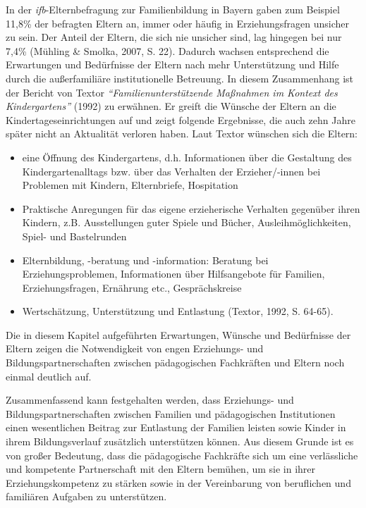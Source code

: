 \documentclass[12pt,a4paper]{article}
\begin{document}
	In der \textit{ifb}-Elternbefragung zur Familienbildung in Bayern gaben zum Beispiel 11,8\% der befragten Eltern an, immer oder häufig in Erziehungsfragen unsicher zu sein. Der Anteil der Eltern, die sich nie unsicher sind, lag hingegen bei nur 7,4\% (Mühling \& Smolka, 2007, S. 22). Dadurch wachsen entsprechend die Erwartungen und Bedürfnisse der Eltern nach mehr Unterstützung und Hilfe durch die außerfamiliäre institutionelle Betreuung. In diesem Zusammenhang ist der  Bericht von Textor \textit{"`Familienunterstützende Maßnahmen im Kontext des Kindergartens"'} (1992) zu erwähnen. Er greift die Wünsche der Eltern an die Kindertageseinrichtungen  auf und zeigt folgende Ergebnisse, die auch zehn Jahre später nicht an Aktualität verloren haben. Laut Textor wünschen sich die Eltern:
	\begin{itemize}
\item eine Öffnung des Kindergartens, d.h. Informationen über die Gestaltung des Kindergartenalltags bzw. über das Verhalten der Erzieher/-innen bei Problemen mit Kindern, Elternbriefe, Hospitation
 \item Praktische Anregungen für das eigene erzieherische Verhalten gegenüber ihren Kindern, z.B. Ausstellungen guter Spiele und Bücher, Aus\-leih\-mög\-lich\-kei\-ten, Spiel- und Bastelrunden
 \item Elternbildung, -beratung und -information: Beratung bei Erziehungsproblemen, Informationen  über Hilfsangebote für Familien, Erziehungsfragen, Ernährung  etc., Gesprächskreise
 \item Wertschätzung, Unterstützung und Entlastung (Textor, 1992, S. 64-65).
 \end{itemize}
 
Die in diesem Kapitel aufgeführten Erwartungen, Wünsche und Bedürfnisse der Eltern zeigen die Notwendigkeit von engen Erziehungs- und Bildungspartnerschaften zwischen pädagogischen Fachkräften und Eltern noch einmal deutlich auf.

	Zusammenfassend kann festgehalten werden, dass Erziehungs- und Bildungspartnerschaften zwischen Familien und pädagogischen Institutionen einen wesentlichen Beitrag zur Entlastung der Familien leisten sowie Kinder in ihrem Bildungsverlauf zusätzlich unterstützen können. Aus diesem Grunde ist es von großer Bedeutung, dass die pädagogische Fachkräfte sich um eine verlässliche und kompetente Partnerschaft mit den Eltern bemühen, um sie in ihrer Erziehungskompetenz zu stärken sowie in der Vereinbarung von beruflichen und familiären Aufgaben zu unterstützen.
\end{document}

